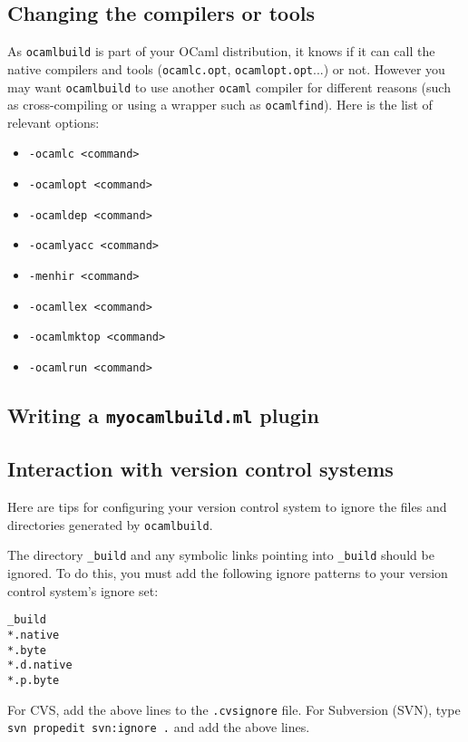 \documentclass[9pt]{article}
\newcommand{\ocb}{\texttt{ocamlbuild}\xspace}
\begin{document}
\subsection{Changing the compilers or tools}
As \ocb is part of your OCaml distribution, it knows if it can call the
native compilers and tools (\texttt{ocamlc.opt}, \texttt{ocamlopt.opt}...)
or not.  However you may want \ocb to use another \texttt{ocaml} compiler
for different reasons (such as cross-compiling or using a wrapper such as
\texttt{ocamlfind}).  Here is the list of relevant options:
\begin{itemize}
  \item \texttt{-ocamlc <command>}
  \item \texttt{-ocamlopt <command>}
  \item \texttt{-ocamldep <command>}
  \item \texttt{-ocamlyacc <command>}
  \item \texttt{-menhir <command>}
  \item \texttt{-ocamllex <command>}
  \item \texttt{-ocamlmktop <command>}
  \item \texttt{-ocamlrun <command>}
\end{itemize}

\subsection{Writing a \texttt{myocamlbuild.ml} plugin}
\subsection{Interaction with version control systems}
Here are tips for configuring your version control system to ignore the files
and directories generated by \ocb.

The directory \texttt{\_build} and any symbolic links
pointing into \texttt{\_build} should be ignored.
To do this, you must add the following ignore patterns to your version
control system's ignore set:
\begin{verbatim}
_build
*.native
*.byte
*.d.native
*.p.byte
\end{verbatim}

For CVS, add the above lines to the \texttt{.cvsignore} file.
For Subversion (SVN), type \texttt{svn propedit svn:ignore .} and add the
above lines.
\end{document}
